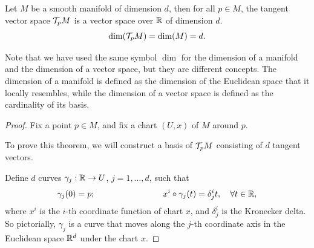 \begin{theorem}
	Let \(M\) be a smooth manifold of dimension \(d\), then for all \(p \in M\), the tangent vector space \(\mathcal T_p M\) is a vector space over \(\mathbb R\) of dimension \(d\).
	\begin{equation}
		\dim(\mathcal T_p M) = \dim(M) = d.
	\end{equation}
\end{theorem}
Note that we have used the same symbol \(\dim\) for the dimension of a manifold and the dimension of a vector space, but they are different concepts. The dimension of a manifold is defined as the dimension of the Euclidean space that it locally resembles, while the dimension of a vector space is defined as the cardinality of its basis.
\begin{proof}
	Fix a point \(p \in M\), and fix a chart \((U, x)\) of \(M\) around \(p\).

	To prove this theorem, we will construct a basis of \(\mathcal T_p M\) consisting of \(d\) tangent vectors.

	Define \(d\) curves \(\gamma_j: \mathbb R \to U\), \(j = 1, \ldots, d\), such that
	\begin{equation}
		\gamma_j(0) = p; \qquad \qquad \qquad \qquad x^i \circ \gamma_j(t) = \delta_j^i t, \quad \forall t \in \mathbb R,
	\end{equation}
	where \(x^i\) is the \(i\)-th coordinate function of chart \(x\), and \(\delta_j^i\) is the Kronecker delta. So pictorially, \(\gamma_j\) is a curve that moves along the \(j\)-th coordinate axis in the Euclidean space \(\mathbb R^d\) under the chart \(x\).


\end{proof}
